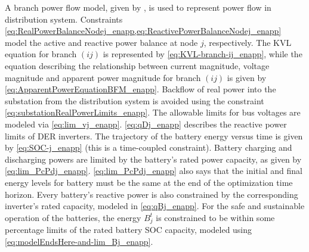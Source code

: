 A branch power flow model, given by , is used to represent power flow in distribution system. Constraints \cref{eq:RealPowerBalanceNodej_enapp,eq:ReactivePowerBalanceNodej_enapp} model the active and reactive power balance at node $j$, respectively.
The KVL equation for branch $(ij)$ is represented by \cref{eq:KVL-branch-ij_enapp}, while the equation describing the relationship between current magnitude, voltage magnitude and apparent power magnitude for branch $(ij)$ is given by \cref{eq:ApparentPowerEquationBFM_enapp}. Backflow of real power into the substation from the distribution system is avoided using the constraint \cref{eq:substationRealPowerLimits_enapp}. The allowable limits for bus voltages are modeled via \cref{eq:lim_vj_enapp}. \cref{eq:qDj_enapp} describes the reactive power limits of DER inverters. The trajectory of the battery energy versus time is given by \cref{eq:SOC-j_enapp} (this is a time-coupled constraint). Battery charging and discharging powers are limited by the battery's rated power capacity, as given by \cref{eq:lim_PcPdj_enapp}. \cref{eq:lim_PcPdj_enapp} also says that the initial and final energy levels for battery must be the same at the end of the optimization time horizon. Every battery's reactive power is also constrained by the corresponding inverter's rated capacity, modeled in \cref{eq:qBj_enapp}. For the safe and sustainable operation of the batteries, the energy $B^{t}_{j}$ is constrained to be within some percentage limits of the rated battery SOC capacity, modeled using \cref{eq:modelEndsHere-and-lim_Bj_enapp}.

